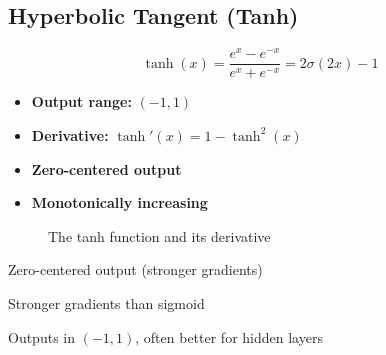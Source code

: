 \subsection{Hyperbolic Tangent (Tanh)}

\begin{equation}
\tanh(x) = \frac{e^x - e^{-x}}{e^x + e^{-x}} = 2\sigma(2x) - 1
\end{equation}

\begin{properties}
\begin{itemize}
    \item \textbf{Output range:} $(-1, 1)$
    \item \textbf{Derivative:} $\tanh'(x) = 1 - \tanh^2(x)$
    \item \textbf{Zero-centered output}
    \item \textbf{Monotonically increasing}
\end{itemize}
\end{properties}

\begin{figure}[h]
    \centering
    \caption[Tanh function and its derivative]{The tanh function and its derivative}
    \label{fig:tanh}
\end{figure}

\begin{advantages}
    \item Zero-centered output (stronger gradients)
    \item Stronger gradients than sigmoid
    \item Outputs in $(-1, 1)$, often better for hidden layers
\end{advantages}

